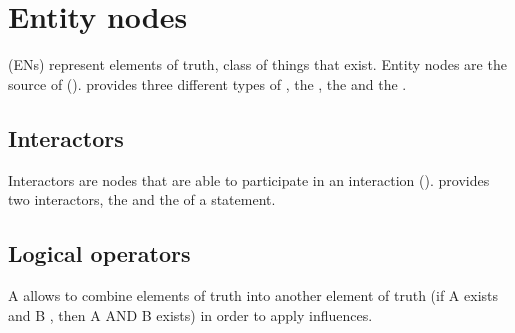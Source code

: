  
\section{Entity nodes}\label{sec:ENs}

 (ENs) represent elements of truth, class of things that exist. 
Entity nodes are the source of  (). \SBGNERLone{} provides three different types of , the , the  and the . 

\subsection{Interactors}\label{sec:interactors}

Interactors are nodes that are able to participate in an interaction (). \SBGNERLone{} provides two interactors, the  and the  of a statement.





\subsection{Logical operators}\label{sec:logic}

A  allows to combine elements of truth into another element of truth (if A exists and B , then A AND B exists) in order to apply influences. 


